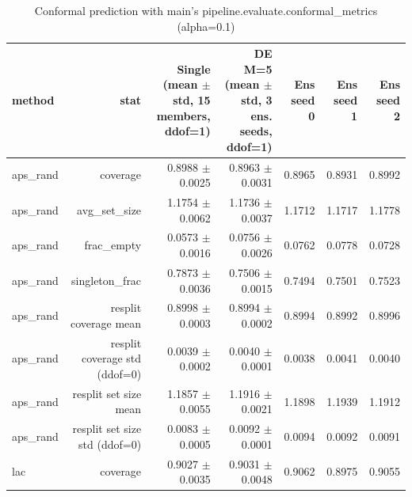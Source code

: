 \begin{table}
\centering
\caption{Conformal prediction with main's pipeline.evaluate.conformal_metrics (alpha=0.1)}
\label{tab:de_conformal_main}
\begin{tabular}{lrrrrrr}
\toprule
           method &                                     stat & Single (mean $\pm$ std, 15 members, ddof=1) & DE M=5 (mean $\pm$ std, 3 ens. seeds, ddof=1) & Ens seed 0 & Ens seed 1 & Ens seed 2 \\
\midrule
         aps\_rand &                                 coverage &                         0.8988 $\pm$ 0.0025 &                           0.8963 $\pm$ 0.0031 &     0.8965 &     0.8931 &     0.8992 \\
         aps\_rand &                             avg\_set\_size &                         1.1754 $\pm$ 0.0062 &                           1.1736 $\pm$ 0.0037 &     1.1712 &     1.1717 &     1.1778 \\
         aps\_rand &                               frac\_empty &                         0.0573 $\pm$ 0.0016 &                           0.0756 $\pm$ 0.0026 &     0.0762 &     0.0778 &     0.0728 \\
         aps\_rand &                           singleton\_frac &                         0.7873 $\pm$ 0.0036 &                           0.7506 $\pm$ 0.0015 &     0.7494 &     0.7501 &     0.7523 \\
         aps\_rand &                    resplit coverage mean &                         0.8998 $\pm$ 0.0003 &                           0.8994 $\pm$ 0.0002 &     0.8994 &     0.8992 &     0.8996 \\
         aps\_rand &            resplit coverage std (ddof=0) &                         0.0039 $\pm$ 0.0002 &                           0.0040 $\pm$ 0.0001 &     0.0038 &     0.0041 &     0.0040 \\
         aps\_rand &                    resplit set size mean &                         1.1857 $\pm$ 0.0055 &                           1.1916 $\pm$ 0.0021 &     1.1898 &     1.1939 &     1.1912 \\
         aps\_rand &            resplit set size std (ddof=0) &                         0.0083 $\pm$ 0.0005 &                           0.0092 $\pm$ 0.0001 &     0.0094 &     0.0092 &     0.0091 \\
              lac &                                 coverage &                         0.9027 $\pm$ 0.0035 &                           0.9031 $\pm$ 0.0048 &     0.9062 &     0.8975 &     0.9055 \\

\end{tabular}
\end{table}
